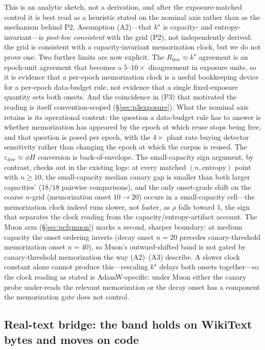 \documentclass[11pt]{article}
\begin{document}
This is an analytic sketch, not a derivation, and after the exposure-matched control
it is best read as a heuristic stated on the nominal axis rather than as the
mechanism behind P2. Assumption (A2)---that $k^\star$ is
capacity- and entropy-invariant---is \emph{post-hoc consistent} with the grid (P2), not
independently derived: the grid is consistent with a capacity-invariant memorization clock,
but we do not prove one. Two further limits are now explicit. The $R_{\mathrm{free}}
\approx k^\star$ agreement is an epoch-unit agreement that becomes a $5$--$10\times$
disagreement in exposure units, so it is evidence that a per-epoch memorization
clock is a useful bookkeeping device for a per-epoch data-budget rule, not evidence
that a single fixed-exposure quantity sets both onsets. And the coincidence in (P3)
that motivated the reading is itself convention-scoped
(\S\ref{sec:p3exposure}). What the nominal axis retains is its operational
content: the question a data-budget rule has to answer is whether memorization has
appeared by the epoch at which reuse stops being free, and that question is posed
per epoch, with the $4\times$ plant rate buying detector sensitivity rather than
changing the epoch at which the corpus is reused. The $\varepsilon_{\mathrm{free}}\approx\phi H$ conversion is
back-of-envelope. The small-capacity sign argument, by contrast, checks out in the existing
logs: at every matched $(n,\text{entropy})$ point with $n\geq10$, the small-capacity median
canary gap is smaller than both larger capacities' ($18/18$ pairwise comparisons), and the
only onset-grade shift on the coarse $n$-grid (memorization onset $10\to20$) occurs in a
small-capacity cell---the memorization clock indeed runs slower, not faster, as $\rho$
falls toward $1$, the sign that separates the clock reading from the capacity/entropy-artifact
account. The Muon arm (\S\ref{sec:pcfgmuon}) marks a second, sharper boundary: at
medium capacity the onset ordering inverts (decay onset $n{=}20$ precedes
canary-threshold memorization onset $n{=}40$), so Muon's outward-shifted band is not
gated by canary-threshold memorization the way (A2)--(A3) describe. A slower clock
constant alone cannot produce this---rescaling $k^\star$ delays both onsets
together---so the clock reading as stated is AdamW-specific: under Muon either the
canary probe under-reads the relevant memorization or the decay onset has a
component the memorization gate does not control.

\subsection{Real-text bridge: the band holds on WikiText bytes and moves on code}\label{sec:scale}
\end{document}
